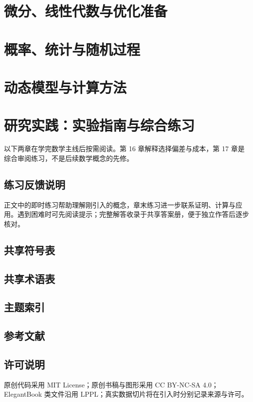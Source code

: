 \documentclass[lang=cn,11pt,scheme=chinese]{elegantbook}
\begin{document}
\part{微分、线性代数与优化准备}


\part{概率、统计与随机过程}






\part{动态模型与计算方法}




\part{研究实践：实验指南与综合练习}
以下两章在学完数学主线后按需阅读。第 16 章解释选择偏差与成本，第 17 章是综合审阅练习，不是后续数学概念的先修。



\appendix

\chapter{练习反馈说明}
正文中的即时练习帮助理解刚引入的概念，章末练习进一步联系证明、计算与应用。遇到困难时可先阅读提示；完整解答收录于共享答案册，便于独立作答后逐步核对。

\chapter{共享符号表}


\chapter{共享术语表}


\chapter{主题索引}


\chapter{参考文献}
\printbibliography[heading=none]

\chapter{许可说明}
原创代码采用 MIT License；原创书稿与图形采用 CC BY-NC-SA 4.0；ElegantBook 类文件沿用 LPPL；真实数据切片将在引入时分别记录来源与许可。
\end{document}
